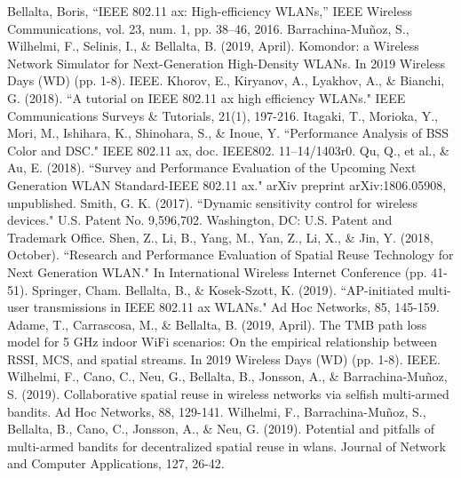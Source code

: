 \documentclass[conference]{IEEEtran}
\begin{document}
	\begin{thebibliography}{00}
		 Bellalta, Boris, ``IEEE 802.11 ax: High-efficiency WLANs,'' IEEE Wireless Communications, vol. 23, num. 1, pp. 38--46, 2016.
		 Barrachina-Mu\~noz, S., Wilhelmi, F., Selinis, I., \& Bellalta, B. (2019, April). Komondor: a Wireless Network Simulator for Next-Generation High-Density WLANs. In 2019 Wireless Days (WD) (pp. 1-8). IEEE.
		 Khorov, E., Kiryanov, A., Lyakhov, A., \& Bianchi, G. (2018). ``A tutorial on IEEE 802.11 ax high efficiency WLANs." IEEE Communications Surveys \& Tutorials, 21(1), 197-216.
		 Itagaki, T., Morioka, Y., Mori, M., Ishihara, K., Shinohara, S., \& Inoue, Y. ``Performance Analysis of BSS Color and DSC." IEEE 802.11 ax, doc. IEEE802. 11–14/1403r0. 
		 Qu, Q., et al., \& Au, E. (2018). ``Survey and Performance Evaluation of the Upcoming Next Generation WLAN Standard-IEEE 802.11 ax." arXiv preprint arXiv:1806.05908, unpublished.
		 Smith, G. K. (2017). ``Dynamic sensitivity control for wireless devices." U.S. Patent No. 9,596,702. Washington, DC: U.S. Patent and Trademark Office.
		 Shen, Z., Li, B., Yang, M., Yan, Z., Li, X., \& Jin, Y. (2018, October). ``Research and Performance Evaluation of Spatial Reuse Technology for Next Generation WLAN." In International Wireless Internet Conference (pp. 41-51). Springer, Cham.
		 Bellalta, B., \& Kosek-Szott, K. (2019). ``AP-initiated multi-user transmissions in IEEE 802.11 ax WLANs." Ad Hoc Networks, 85, 145-159.
		 Adame, T., Carrascosa, M., \& Bellalta, B. (2019, April). The TMB path loss model for 5 GHz indoor WiFi scenarios: On the empirical relationship between RSSI, MCS, and spatial streams. In 2019 Wireless Days (WD) (pp. 1-8). IEEE.
		 Wilhelmi, F., Cano, C., Neu, G., Bellalta, B., Jonsson, A., \& Barrachina-Mu\~noz, S. (2019). Collaborative spatial reuse in wireless networks via selfish multi-armed bandits. Ad Hoc Networks, 88, 129-141.
		 Wilhelmi, F., Barrachina-Mu\~noz, S., Bellalta, B., Cano, C., Jonsson, A., \& Neu, G. (2019). Potential and pitfalls of multi-armed bandits for decentralized spatial reuse in wlans. Journal of Network and Computer Applications, 127, 26-42.
	\end{thebibliography}
	
\end{document}
